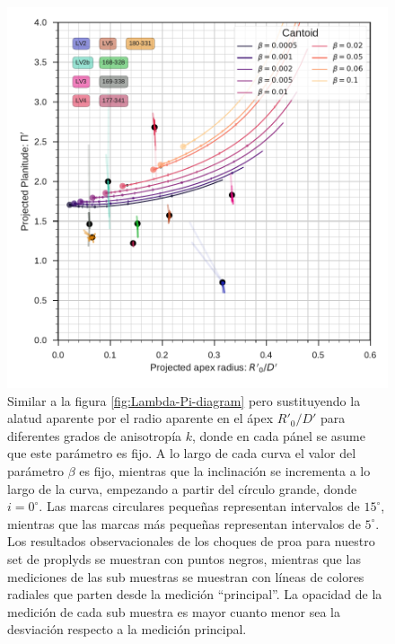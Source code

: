 \begin{figure}
  \centering
 \includegraphics[width=0.9\linewidth]{./Figures/obs-diagnostic-Pi-R0-Cantoid}  
  \caption[Diagrama $\Pi'-R'_0/D'$ donde se comparan las mediciones de los proplyds con las predicciones teóricas del modelo de capa delgada.]{Similar a la figura \ref{fig:Lambda-Pi-diagram} pero sustituyendo la alatud aparente por el radio aparente en el ápex $R'_0/D'$ para diferentes grados de anisotropía $k$, donde en cada pánel se asume que este parámetro es fijo. A lo largo de cada curva el valor del parámetro $\beta$ es fijo,  mientras que la inclinación se incrementa a lo largo de la curva, empezando a partir del círculo grande, donde $i=0^\circ$. Las marcas circulares pequeñas representan intervalos de $15^\circ$, mientras que las marcas más pequeñas representan intervalos de $5^\circ$. Los resultados observacionales de los choques de proa para nuestro set de proplyds se muestran con puntos negros, mientras que las mediciones de las sub muestras se muestran con líneas de colores radiales que parten desde la medición ``principal''. La opacidad de la medición de cada sub muestra es mayor cuanto menor sea la desviación respecto a la medición principal.}
  \label{fig:obs-diagnostic}
\end{figure}

